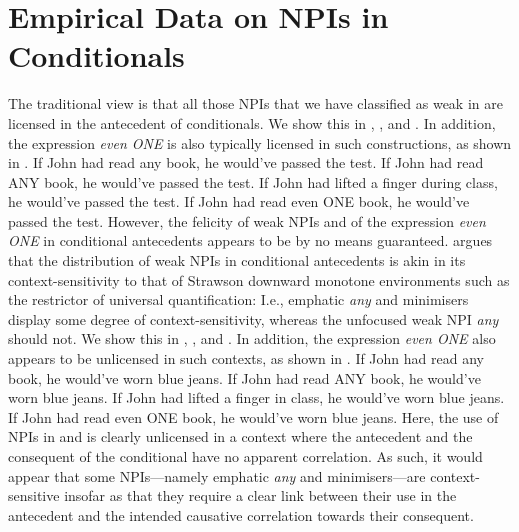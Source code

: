 \section{Empirical Data on NPIs in Conditionals}
The traditional view is that all those NPIs that we have classified as weak in  \parencite{Ladusaw1980,Wouden1997,Jeong2021,Jeong2022} are licensed in the antecedent of conditionals. We show this in , , and . In addition, the expression \textit{even \MakeUppercase{one}} is also typically licensed in such constructions, as shown in .
\pex\label{ex:npi-conditional-good}
\a If John had read any book, he would've passed the test.
\a If John had read \MakeUppercase{any} book, he would've passed the test.
\a If John had lifted a finger during class, he would've passed the test.
\a If John had read even \MakeUppercase{one} book, he would've passed the test.
\xe
However, the felicity of weak NPIs and of the expression \textit{even \MakeUppercase{one}} in conditional antecedents appears to be by no means guaranteed. \textcite[p.~122]{Crnic2014-dogma} argues that the distribution of weak NPIs in conditional antecedents is akin in its context-sensitivity to that of Strawson downward monotone environments such as the restrictor of universal quantification: I.e., emphatic \textit{any} and minimisers display some degree of context-sensitivity, whereas the unfocused weak NPI \textit{any} should not. We show this in , , and . In addition, the expression \textit{even \MakeUppercase{one}} also appears to be unlicensed in such contexts, as shown in .
\pex\label{ex:npi-conditional-bad}
\a\ljudge{} If John had read any book, he would've worn blue jeans.
\a\ljudge{\#} If John had read \MakeUppercase{any} book, he would've worn blue jeans.
\a\ljudge{\#} If John had lifted a finger in class, he would've worn blue jeans.
\a\ljudge{\#} If John had read even \MakeUppercase{one} book, he would've worn blue jeans.
\xe
Here, the use of NPIs in  and  is clearly unlicensed in a context where the antecedent and the consequent of the conditional have no apparent correlation. As such, it would appear that some NPIs---namely emphatic \textit{any} and minimisers---are context-sensitive insofar as that they require a clear link between their use in the antecedent and the intended causative correlation towards their consequent.

